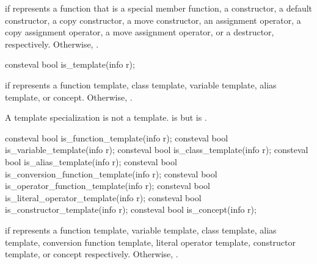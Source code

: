 \begin{itemdescr}
\pnum
\returns
{} if  represents a function that is a
special member function,
a constructor,
a default constructor,
a copy constructor,
a move constructor,
an assignment operator,
a copy assignment operator,
a move assignment operator, or
a destructor, respectively.
Otherwise, .
\end{itemdescr}

%
\begin{itemdecl}
consteval bool is_template(info r);
\end{itemdecl}

\begin{itemdescr}
\pnum
\returns
{} if  represents a
function template,
class template,
variable template,
alias template, or
concept.
Otherwise, .

\pnum
\begin{note}
A template specialization is not a template.
 is 
but  is .
\end{note}
\end{itemdescr}

%
%
%
%
%
%
%
%
%
\begin{itemdecl}
consteval bool is_function_template(info r);
consteval bool is_variable_template(info r);
consteval bool is_class_template(info r);
consteval bool is_alias_template(info r);
consteval bool is_conversion_function_template(info r);
consteval bool is_operator_function_template(info r);
consteval bool is_literal_operator_template(info r);
consteval bool is_constructor_template(info r);
consteval bool is_concept(info r);
\end{itemdecl}

\begin{itemdescr}
\pnum
\returns
{} if  represents a
function template,
variable template,
class template,
alias template,
conversion function template,
literal operator template,
constructor template, or
concept
respectively.
Otherwise, .
\end{itemdescr}

